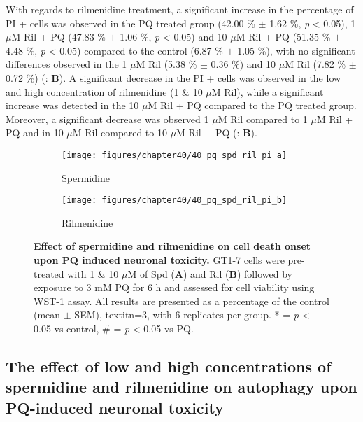 With regards to rilmenidine treatment, a significant increase in the percentage of PI + cells was observed in the PQ treated group (42.00 \% $\pm$ 1.62 \%, \textit{p} < 0.05), 1 $\mu$M Ril + PQ (47.83 \% $\pm$ 1.06 \%, \textit{p} < 0.05) and 10 $\mu$M Ril + PQ (51.35 \% $\pm$ 4.48 \%, \textit{p} < 0.05) compared to the control (6.87 \% $\pm$ 1.05 \%), with no significant differences observed in the 1 $\mu$M Ril (5.38 \% $\pm$ 0.36 \%) and 10 $\mu$M Ril (7.82 \% $\pm$ 0.72 \%) (: \textbf{B}). A significant decrease in the PI + cells was observed in the low and high concentration of rilmenidine (1 \& 10 $\mu$M Ril), while a significant increase was detected in the 10 $\mu$M Ril + PQ compared to the PQ treated group.  Moreover, a significant decrease was observed 1 $\mu$M Ril compared to 1 $\mu$M Ril + PQ and in 10 $\mu$M Ril compared to 10 $\mu$M Ril + PQ (: \textbf{B}).

\begin{figure}[!htbp]
  \center
  \begin{subfigure}[b]{0.495\linewidth}
    \texttt{[image: figures/chapter40/40\_pq\_spd\_ril\_pi\_a]}
    \caption{Spermidine}
  \end{subfigure}
  \begin{subfigure}[b]{0.495\linewidth}
    \texttt{[image: figures/chapter40/40\_pq\_spd\_ril\_pi\_b]}
    \caption{Rilmenidine}
  \end{subfigure}
  \caption[Effect of spermidine and rilmenidine on cell death onset upon PQ induced neuronal toxicity]{\textbf{Effect of spermidine and rilmenidine on cell death onset upon PQ induced neuronal toxicity.} GT1-7 cells were pre-treated with 1 \& 10 $\mu$M of Spd (\textbf{A}) and Ril (\textbf{B}) followed by exposure to 3 mM PQ for 6 h and assessed for cell viability using WST-1 assay. All results are presented as a percentage of the control (mean $\pm$ SEM), textit{n}=3, with 6 replicates per group. * = \textit{p} < 0.05 vs control, \# = \textit{p} < 0.05 vs PQ.}
  \label{fig:40_pq_spd_ril_pi_a}
\end{figure}


\subsection{The effect of low and high concentrations of spermidine and rilmenidine on autophagy upon PQ-induced neuronal toxicity} 
